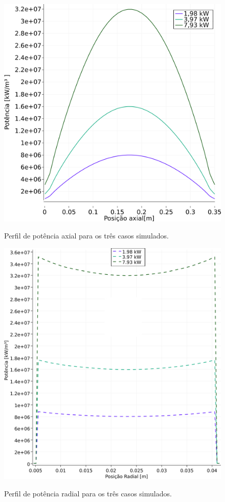 \begin{figure}[htb]
  \caption{Perfil de potência axial para os três casos simulados.}
  \centering\includegraphics[scale=0.6]{figuras/Q_all_NC_port.png}
  \label{fig:perf-nac-axial}
\end{figure}

\begin{figure}[htb]
  \caption[Perfil de potência radial para os três casos simulados.]{Perfil de potência radial para os três casos simulados.}
  \centering\includegraphics[scale=0.7]{figuras/Q_x_NC_square_port.png}
  \label{fig:perf-Q-nac-radial}
\end{figure}

